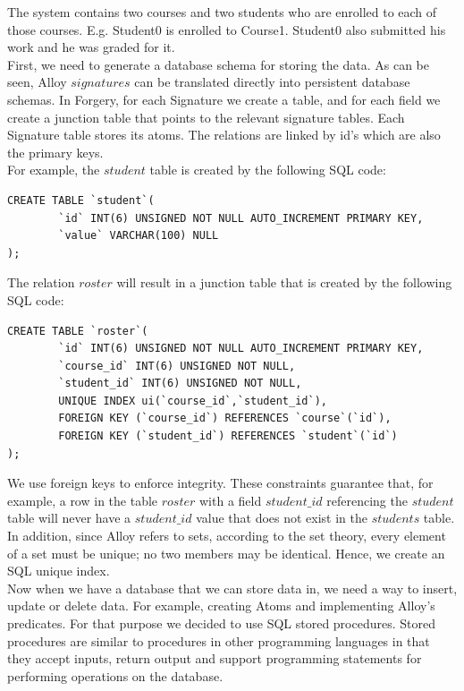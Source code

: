\documentclass[oneside]{book}
\begin{document}
The system contains two courses and two students who are enrolled to each of those courses. E.g. Student0 is enrolled to Course1. Student0 also submitted his work and he was graded for it.\\

First, we need to generate a database schema for storing the data. As can be seen, Alloy $signatures$ can be translated directly into persistent database schemas. In Forgery, for each Signature we create a table, and for each field we create a junction table that points to the relevant signature tables. Each Signature table stores its atoms. The relations are linked by id's which are also the primary keys.\\

For example, the $student$ table is created by the following SQL code:

\begin{lstlisting}
CREATE TABLE `student`(
        `id` INT(6) UNSIGNED NOT NULL AUTO_INCREMENT PRIMARY KEY,
        `value` VARCHAR(100) NULL
);
\end{lstlisting}

The relation $roster$ will result in a junction table that is created by the following SQL code:

\begin{lstlisting}
CREATE TABLE `roster`(
        `id` INT(6) UNSIGNED NOT NULL AUTO_INCREMENT PRIMARY KEY,
        `course_id` INT(6) UNSIGNED NOT NULL,
        `student_id` INT(6) UNSIGNED NOT NULL,
        UNIQUE INDEX ui(`course_id`,`student_id`),
        FOREIGN KEY (`course_id`) REFERENCES `course`(`id`),
        FOREIGN KEY (`student_id`) REFERENCES `student`(`id`)
);
\end{lstlisting}

We use foreign keys to enforce integrity. These constraints guarantee that, for example, a row in the table $roster$ with a field $student\_id$ referencing the $student$ table will never have a $student\_id$ value that does not exist in the $students$ table. In addition, since Alloy refers to sets, according to the set theory, every element of a set must be unique; no two members may be identical. Hence, we create an SQL unique index.\\

Now when we have a database that we can store data in, we need a way to insert, update or delete data. For example, creating Atoms and implementing Alloy's predicates. For that purpose we decided to use SQL stored procedures. Stored procedures are similar to procedures in other programming languages in that they accept inputs, return output and support programming statements for performing operations on the database.\\
\end{document}
